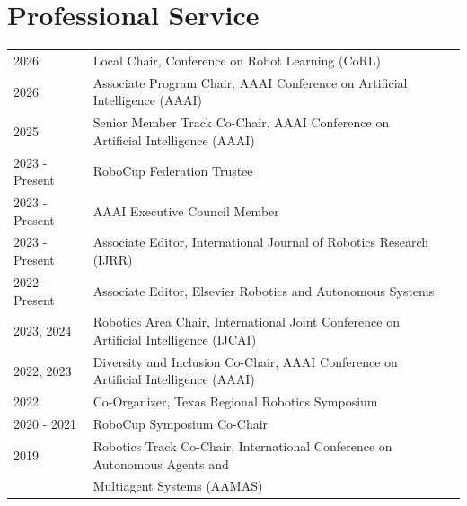 \documentclass[Times]{article}
\begin{document}


%







\section*{Professional Service}

\begin{tabular}{ p{2cm} l p{8cm}}
  2026 & Local Chair, Conference on Robot Learning (CoRL)\\
  2026 & Associate Program Chair, AAAI Conference on Artificial Intelligence (AAAI)\\
  2025 & Senior Member Track Co-Chair, AAAI Conference on Artificial Intelligence (AAAI)\\
  2023 - Present & RoboCup Federation Trustee\\
  2023 - Present & AAAI Executive Council Member \\
  2023 - Present & Associate Editor, International Journal of Robotics Research (IJRR)\\
  2022 - Present & Associate Editor, Elsevier Robotics and Autonomous Systems\\
  2023, 2024 & Robotics Area Chair, International Joint Conference on Artificial Intelligence (IJCAI)\\
  2022, 2023 & Diversity and Inclusion Co-Chair, AAAI Conference on Artificial
  Intelligence (AAAI)\\
  2022 & Co-Organizer, Texas Regional Robotics Symposium\\
  2020 - 2021 & RoboCup Symposium Co-Chair\\
  2019 & Robotics Track Co-Chair, International Conference on Autonomous Agents
  and\\
  & Multiagent Systems (AAMAS)\\

\end{tabular}
\end{document}
